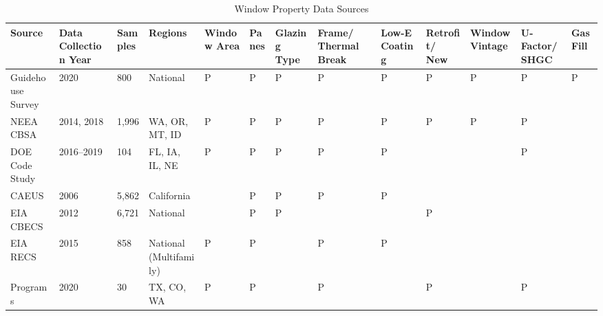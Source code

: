 \begin{table}
\scriptsize
\centering
\caption[Window Property Data Sources]{Window Property Data Sources}
\label{tab:window_data_sources}
\begin{tabular}{|p{0.6in}|p{0.3in}|p{0.3in}|p{0.4in}|p{0.3in}|p{0.3in}|p{0.3in}|p{0.3in}|p{0.3in}|p{0.3in}|p{0.3in}|p{0.3in}|p{0.3in}|}
\hline
\textbf{Source} & \textbf{Data Collection Year} & \textbf{Samples} & \textbf{Regions} & \textbf{Window Area} & \textbf{Panes} & \textbf{Glazing Type} & \textbf{Frame/ Thermal Break} & \textbf{Low-E Coating} &\textbf{ Retrofit/ New} & \textbf{Window Vintage} & \textbf{U-Factor/ SHGC} & \textbf{Gas Fill} \\ \hline
Guidehouse Survey                & 2020                 & 800             & National                 & P           & P     & P            & P                    & P             & P             & P              & P              & P        \\ \hline
NEEA CBSA                        & 2014,   2018         & 1,996            & WA,   OR, MT, ID         & P           & P     & P            & P                    & P             & P             & P              & P              &          \\ \hline
DOE Code Study                   & 2016--2019            & 104             & FL,   IA, IL, NE          & P           & P     & P            & P                    & P             &               &                & P              &          \\ \hline
CAEUS                            & 2006                 & 5,862            & California               &             & P     & P            & P                    & P             &               &                &                &          \\ \hline
EIA CBECS                        & 2012                 & 6,721            & National                 &             & P     & P            &                      &               & P             &                &                &          \\ \hline
EIA RECS                         & 2015                 & 858             & National   (Multifamily) & P           & P     &              & P                    & P             &               &                &                &          \\ \hline
Programs                         & 2020                 & 30              & TX,   CO, WA             & P           & P     &              & P                    &               & P             &                & P              &          \\ \hline

\end{tabular}
\end{table}
